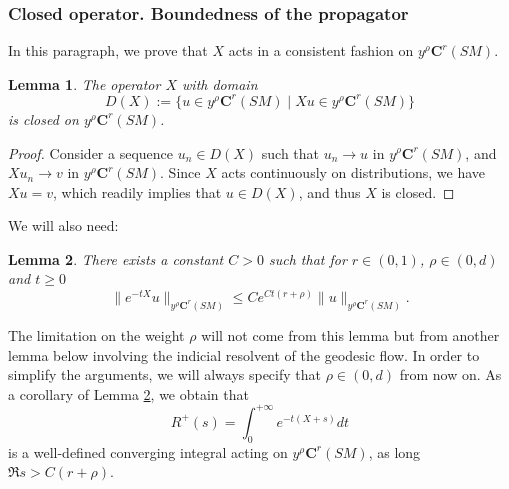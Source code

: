\documentclass[JEP,XML,SOM,Unicode,NoFloatCountersInSection]{cedram}
\newcommand{\bC}{\boldsymbol{C}}
\theoremstyle{plain}
\newtheorem{lemma}{Lemma}[section]
\theoremstyle{definition}
\begin{document}
\subsubsection{Closed operator. Boundedness of the propagator}

\label{sssection:boundedness}

In this paragraph, we prove that $X$ acts in a consistent fashion on $y^\rho \bC^r(SM)$.

\begin{lemma}
The operator $X$ with domain
\[
D(X):= \{ u\in y^\rho \bC^r(SM)\mid Xu \in y^\rho \bC^r(SM)\}
\]
is closed on $y^\rho \bC^r(SM)$.
\end{lemma}

\begin{proof}
Consider a sequence $u_n \in D(X)$ such that $u_n \to u$ in $y^\rho\bC^r(SM)$, and $Xu_n\to v$ in $y^\rho \bC^r(SM)$. Since $X$ acts continuously on distributions, we have $Xu = v$, which readily implies that $u\in D(X)$, and thus $X$ is closed.
\end{proof}

We will also need:

\begin{lemma}
\label{lemma:prop}
There exists a constant $C>0$ such that for $r \in (0,1)$, $\rho\in (0,d)$ and $t\geq 0$
\[
\| e^{-tX} u\|_{y^\rho\bC^r(SM)} \leq C e^{C t (r+ \rho)} \|u\|_{y^\rho \bC^r(SM)}.
\]
\end{lemma}

The limitation on the weight $\rho$ will not come from this lemma but from another lemma below involving the indicial resolvent of the geodesic flow. In order to simplify the arguments, we will always specify that $\rho \in (0,d)$ from now on. As a corollary of Lemma \ref{lemma:prop}, we obtain that
\[
R^+(s) = \int_0^{+\infty} e^{-t(X+s)} dt
\]
is a well-defined converging integral acting on $y^\rho \bC^r(SM)$, as long $\Re s > C ( r+ \rho)$.
\end{document}
